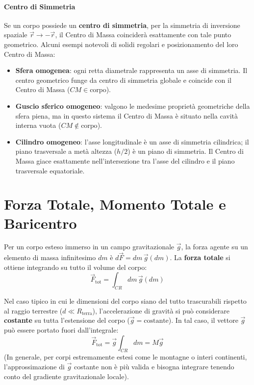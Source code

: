 \paragraph{Centro di Simmetria}
Se un corpo possiede un \textbf{centro di simmetria}, per la simmetria di inversione spaziale $\vec{r} \to -\vec{r}$, il Centro di Massa coinciderà esattamente con tale punto geometrico.
Alcuni esempi notevoli di solidi regolari e posizionamento del loro Centro di Massa:
\begin{itemize}
    \item \textbf{Sfera omogenea}: ogni retta diametrale rappresenta un asse di simmetria. Il centro geometrico funge da centro di simmetria globale e coincide con il Centro di Massa ($CM \in \text{corpo}$).
    \item \textbf{Guscio sferico omogeneo}: valgono le medesime proprietà geometriche della sfera piena, ma in questo sistema il Centro di Massa è situato nella cavità interna vuota ($CM \notin \text{corpo}$).
    \item \textbf{Cilindro omogeneo}: l'asse longitudinale è un asse di simmetria cilindrica; il piano trasversale a metà altezza ($h/2$) è un piano di simmetria. Il Centro di Massa giace esattamente nell'intersezione tra l'asse del cilindro e il piano trasversale equatoriale.
\end{itemize}

\section{Forza Totale, Momento Totale e Baricentro}
Per un corpo esteso immerso in un campo gravitazionale $\vec{g}$, la forza agente su un elemento di massa infinitesimo $dm$ è $d\vec{F} = dm \, \vec{g}(dm)$. La \textbf{forza totale} si ottiene integrando su tutto il volume del corpo:
\begin{equation}
    \vec{F}_{\text{tot}} = \int_{CR} dm \, \vec{g}(dm)
\end{equation}

Nel caso tipico in cui le dimensioni del corpo siano del tutto trascurabili rispetto al raggio terrestre ($d \ll R_{\text{terra}}$), l'accelerazione di gravità si può considerare \textbf{costante} su tutta l'estensione del corpo ($\vec{g} = \text{costante}$). In tal caso, il vettore $\vec{g}$ può essere portato fuori dall'integrale:
\begin{equation}
    \vec{F}_{\text{tot}} = \vec{g} \int_{CR} dm = M \vec{g}
\end{equation}
(In generale, per corpi estremamente estesi come le montagne o interi continenti, l'approssimazione di $\vec{g}$ costante non è più valida e bisogna integrare tenendo conto del gradiente gravitazionale locale).

